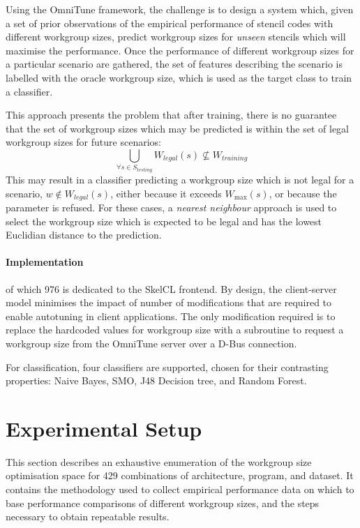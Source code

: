 \documentclass[nonatbib,preprint,9pt]{sigplanconf}
\begin{document}
Using the OmniTune framework, the challenge is to design a system
which, given a set of prior observations of the empirical performance
of stencil codes with different workgroup sizes, predict workgroup
sizes for \emph{unseen} stencils which will maximise the
performance. Once the performance of different workgroup sizes for a
particular scenario are gathered, the set of features describing the
scenario is labelled with the oracle workgroup size, which is used as
the target class to train a classifier.

This approach presents the problem that after training, there is no
guarantee that the set of workgroup sizes which may be predicted is
within the set of legal workgroup sizes for future scenarios:
%
\begin{equation}
  \bigcup_{\forall s \in S_{testing}} W_{legal}(s) \nsubseteq W_{training}
\end{equation}
%
This may result in a classifier predicting a workgroup size which is
not legal for a scenario, $w \not\in W_{legal}(s)$, either because it
exceeds $W_{\max}(s)$, or because the parameter is refused. For these
cases, a \emph{nearest neighbour} approach is used to select the
workgroup size which is expected to be legal and has the lowest
Euclidian distance to the prediction.

\paragraph{Implementation}

of which 976 is dedicated to the SkelCL frontend. By design, the
client-server model minimises the impact of number of modifications
that are required to enable autotuning in client applications. The
only modification required is to replace the hardcoded values for
workgroup size with a subroutine to request a workgroup size from the
OmniTune server over a D-Bus connection.

For classification, four classifiers are supported, chosen for their
contrasting properties: Naive Bayes, SMO, J48 Decision tree, and
Random Forest.


\section{Experimental Setup}

This section describes an exhaustive enumeration of the workgroup size
optimisation space for 429 combinations of architecture, program, and
dataset. It contains the methodology used to collect empirical
performance data on which to base performance comparisons of different
workgroup sizes, and the steps necessary to obtain repeatable results.
\end{document}
